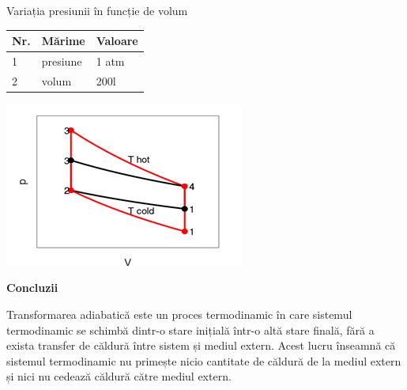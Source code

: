 \documentclass{slides}
\begin{document}
Variația presiunii în funcție de volum
\centering
\begin{tabular}{lll}
	\hline
	Nr.&Mărime&Valoare\\\hline
	1 &presiune&1 atm\\\hline
	2&volum&200l\\\hline
\end{tabular}
\newline
\centering
\includegraphics[scale=2]{Picture1.png}
\begin{center}
\textbf{Concluzii}
\begin{center}
Transformarea adiabatică este un proces termodinamic în care sistemul termodinamic se schimbă dintr-o stare inițială într-o altă stare finală, fără a exista transfer de căldură între sistem și mediul extern. Acest lucru înseamnă că sistemul termodinamic nu primește nicio cantitate de căldură de la mediul extern și nici nu cedează căldură către mediul extern.
\end{center}
\end{center}
\end{document}
